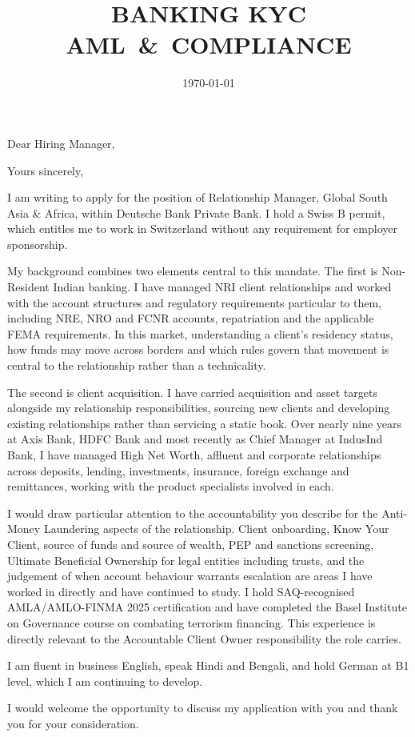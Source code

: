 \documentclass[11pt,a4paper,sans]{moderncv}
\title{BANKING \textbar{} KYC \textbar{} \mbox{AML \& COMPLIANCE}}
\begin{document}
\date{\today}
\opening{Dear Hiring Manager,}
\closing{Yours sincerely,}

\makelettertitle

I am writing to apply for the position of Relationship Manager, Global South
Asia \& Africa, within Deutsche Bank Private Bank. I hold a Swiss B permit,
which entitles me to work in Switzerland without any requirement for employer
sponsorship.

My background combines two elements central to this mandate. The first is
Non-Resident Indian banking. I have managed NRI client relationships and worked
with the account structures and regulatory requirements particular to them,
including NRE, NRO and FCNR accounts, repatriation and the applicable
FEMA requirements. In this market, understanding a client's residency
status, how funds may move across borders and which rules govern that movement
is central to the relationship rather than a technicality.

The second is client acquisition. I have carried acquisition and asset targets
alongside my relationship responsibilities, sourcing new clients and developing
existing relationships rather than servicing a static book. Over nearly nine
years at Axis Bank, HDFC Bank and most recently as Chief Manager at IndusInd
Bank, I have managed High Net Worth, affluent and corporate relationships across
deposits, lending, investments, insurance, foreign exchange and remittances,
working with the product specialists involved in each.

I would draw particular attention to the accountability you describe for the
Anti-Money Laundering aspects of the relationship. Client onboarding, Know Your
Client, source of funds and source of wealth, PEP and sanctions screening,
Ultimate Beneficial Ownership for legal entities including trusts, and the
judgement of when account behaviour warrants escalation are areas I have worked
in directly and have continued to study. I hold SAQ-recognised AMLA/AMLO-FINMA
2025 certification and have completed the Basel Institute on Governance course
on combating terrorism financing. This experience is directly relevant to the
Accountable Client Owner responsibility the role carries.

I am fluent in business English, speak Hindi and Bengali, and hold German at B1
level, which I am continuing to develop.

I would welcome the opportunity to discuss my application with you and thank
you for your consideration.

\makeletterclosing
\end{document}
